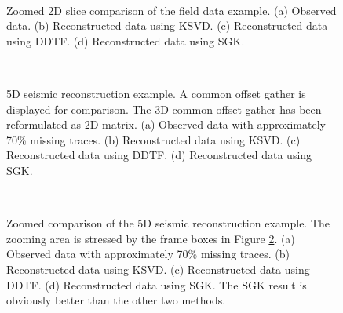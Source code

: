 \begin{figure}[htb!]
\centering
{}
\\
\caption{Zoomed 2D slice comparison of the field data example. (a) Observed data. (b) Reconstructed data using KSVD. (c) Reconstructed data using DDTF. (d) Reconstructed data using SGK. }
\label{fig:fz-obs,fz-ksvd,fz-ddtf,fz-sgk}
\end{figure}

\begin{figure}[htb!]
\centering
{}
\\
\caption{5D seismic reconstruction example. A common offset gather is displayed for comparison. The 3D common offset gather has been reformulated as 2D matrix. (a) Observed data with approximately 70\% missing traces. (b) Reconstructed data using KSVD. (c) Reconstructed data using DDTF. (d) Reconstructed data using SGK. }
\label{fig:f5d-obs,f5d-ksvd,f5d-ddtf,f5d-sgk}
\end{figure}


\begin{figure}[ht!]
\centering
{}
\\
\caption{Zoomed comparison of the 5D seismic reconstruction example. The zooming area is stressed by the frame boxes in Figure \ref{fig:f5d-obs,f5d-ksvd,f5d-ddtf,f5d-sgk}. (a) Observed data with approximately 70\% missing traces. (b) Reconstructed data using KSVD. (c) Reconstructed data using DDTF. (d) Reconstructed data using SGK. The SGK result is obviously better than the other two methods.}
\label{fig:z-obs,z-ksvd,z-ddtf,z-sgk}
\end{figure}

